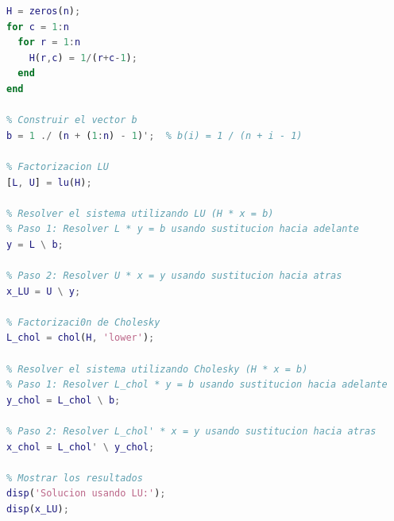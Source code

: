 \begin{homeworkProblem}
\begin{solucion}
\begin{enumerate}[a)]
\begin{lstlisting}[language=Matlab]
% Construir la matriz de Hilbert H_n
H = zeros(n);
for c = 1:n
  for r = 1:n
    H(r,c) = 1/(r+c-1);
  end
end
            
% Construir el vector b
b = 1 ./ (n + (1:n) - 1)';  % b(i) = 1 / (n + i - 1)
            
% Factorizacion LU
[L, U] = lu(H);
            
% Resolver el sistema utilizando LU (H * x = b)
% Paso 1: Resolver L * y = b usando sustitucion hacia adelante
y = L \ b;
            
% Paso 2: Resolver U * x = y usando sustitucion hacia atras
x_LU = U \ y;
            
% Factorizaci0n de Cholesky
L_chol = chol(H, 'lower');
            
% Resolver el sistema utilizando Cholesky (H * x = b)
% Paso 1: Resolver L_chol * y = b usando sustitucion hacia adelante
y_chol = L_chol \ b;
            
% Paso 2: Resolver L_chol' * x = y usando sustitucion hacia atras
x_chol = L_chol' \ y_chol;
            
% Mostrar los resultados
disp('Solucion usando LU:');
disp(x_LU);
            

\end{lstlisting}
\end{enumerate}
\end{solucion}
\end{homeworkProblem}
